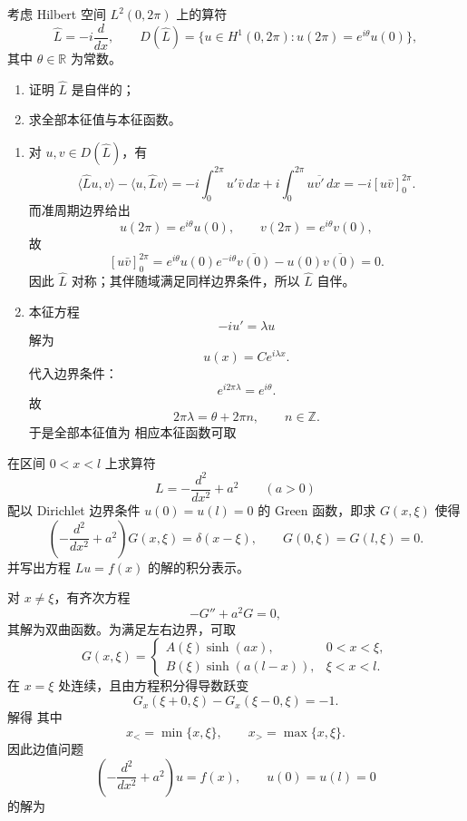 \begin{question}
考虑 Hilbert 空间 $L^2(0,2\pi)$ 上的算符
\[
\hat L=-i\frac{d}{dx},
\qquad
D(\hat L)=\{u\in H^1(0,2\pi):u(2\pi)=e^{i\theta}u(0)\},
\]
其中 $\theta\in\mathbb R$ 为常数。
\begin{enumerate}[label=（\arabic*）,leftmargin=2.8em,itemsep=0.2em]
\item 证明 $\hat L$ 是自伴的；
\item 求全部本征值与本征函数。
\end{enumerate}
\begin{solution}

\begin{enumerate}[label=（\arabic*）,leftmargin=2.8em,itemsep=0.2em]
\item 对 $u,v\in D(\hat L)$，有
\[
\langle \hat L u,v\rangle-\langle u,\hat L v\rangle
=-i\int_0^{2\pi}u'\bar v\,dx+i\int_0^{2\pi}u\overline{v'}\,dx
=-i[u\bar v]_0^{2\pi}.
\]
而准周期边界给出
\[
u(2\pi)=e^{i\theta}u(0),\qquad v(2\pi)=e^{i\theta}v(0),
\]
故
\[
[u\bar v]_0^{2\pi}=e^{i\theta}u(0)e^{-i\theta}\overline{v(0)}-u(0)\overline{v(0)}=0.
\]
因此 $\hat L$ 对称；其伴随域满足同样边界条件，所以 $\hat L$ 自伴。

\item 本征方程
\[
-i u'=\lambda u
\]
解为
\[
u(x)=C e^{i\lambda x}.
\]
代入边界条件：
\[
e^{i2\pi\lambda}=e^{i\theta}.
\]
故
\[
2\pi\lambda=\theta+2\pi n,
\qquad n\in\mathbb Z.
\]
于是全部本征值为
相应本征函数可取
\end{enumerate}
\end{solution}
\end{question}

\begin{question}
在区间 $0<x<l$ 上求算符
\[
L=-\frac{d^2}{dx^2}+a^2\qquad (a>0)
\]
配以 Dirichlet 边界条件 $u(0)=u(l)=0$ 的 Green 函数，即求 $G(x,\xi)$ 使得
\[
\left(-\frac{d^2}{dx^2}+a^2\right)G(x,\xi)=\delta(x-\xi),
\qquad G(0,\xi)=G(l,\xi)=0.
\]
并写出方程 $Lu=f(x)$ 的解的积分表示。
\begin{solution}

对 $x\neq \xi$，有齐次方程
\[
-G''+a^2G=0,
\]
其解为双曲函数。为满足左右边界，可取
\[
G(x,\xi)=
\begin{cases}
A(\xi)\sinh(ax), & 0<x<\xi,\\
B(\xi)\sinh(a(l-x)), & \xi<x<l.
\end{cases}
\]
在 $x=\xi$ 处连续，且由方程积分得导数跃变
\[
G_x(\xi+0,\xi)-G_x(\xi-0,\xi)=-1.
\]
解得
其中
\[
x_<=\min\{x,\xi\},\qquad x_>=\max\{x,\xi\}.
\]
因此边值问题
\[
\left(-\frac{d^2}{dx^2}+a^2\right)u=f(x),
\qquad u(0)=u(l)=0
\]
的解为
\end{solution}
\end{question}


